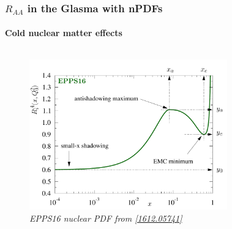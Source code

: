 \documentclass[aspectratio=169,11pt,usenames,dvipsnames]{beamer}
\begin{document}
\begin{frame}[noframenumbering]
    \frametitle{$R_{AA}$ in the Glasma with nPDFs}
    \framesubtitle{Cold nuclear matter effects}
    {\vspace{-15pt}
    \begin{center}
        \begin{columns}[onlytextwidth,t]
           \begin{figure}
                \centering
                \vspace{5pt}
                \includegraphics[width=\columnwidth]{images/FitForm_EPPS16.pdf}
                \captionsetup{justification=centering}
                \caption{\scriptsize\itshape EPPS16 nuclear PDF from \href{https://arxiv.org/abs/1612.05741}{\color{ForestGreen}[1612.05741]}}
            \end{figure}
            \begin{figure}
                \centering

\end{figure}
\end{columns}
\end{center}}
\end{frame}
\end{document}
